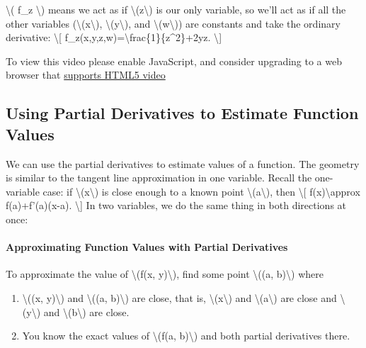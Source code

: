 \textbackslash{}( f\_z \textbackslash{}) means we act as if
\textbackslash{}(z\textbackslash{}) is our only variable, so we'll act
as if all the other variables (\textbackslash{}(x\textbackslash{}),
\textbackslash{}(y\textbackslash{}), and
\textbackslash{}(w\textbackslash{})) are constants and take the ordinary
derivative: \textbackslash{}{[}
f\_z(x,y,z,w)=\textbackslash{}frac\{1\}\{z\^{}2\}+2yz.
\textbackslash{}{]}

To view this video please enable JavaScript, and consider upgrading to a
web browser that \href{http://videojs.com/html5-video-support/}{supports
HTML5 video}

\hypertarget{using-partial-derivatives-to-estimate-function-values}{%
\subsection{Using Partial Derivatives to Estimate Function
Values}\label{using-partial-derivatives-to-estimate-function-values}}

We can use the partial derivatives to estimate values of a function. The
geometry is similar to the tangent line approximation in one variable.
Recall the one-variable case: if \textbackslash{}(x\textbackslash{}) is
close enough to a known point \textbackslash{}(a\textbackslash{}), then
\textbackslash{}{[} f(x)\textbackslash{}approx f(a)+f'(a)(x-a).
\textbackslash{}{]} In two variables, we do the same thing in both
directions at once:

\hypertarget{approximating-function-values-with-partial-derivatives}{%
\paragraph{Approximating Function Values with Partial
Derivatives}\label{approximating-function-values-with-partial-derivatives}}

To approximate the value of \textbackslash{}(f(x, y)\textbackslash{}),
find some point \textbackslash{}((a, b)\textbackslash{}) where

\begin{enumerate}
\tightlist
\item
  \textbackslash{}((x, y)\textbackslash{}) and \textbackslash{}((a,
  b)\textbackslash{}) are close, that is,
  \textbackslash{}(x\textbackslash{}) and
  \textbackslash{}(a\textbackslash{}) are close and
  \textbackslash{}(y\textbackslash{}) and
  \textbackslash{}(b\textbackslash{}) are close.
\item
  You know the exact values of \textbackslash{}(f(a, b)\textbackslash{})
  and both partial derivatives there.
\end{enumerate}

